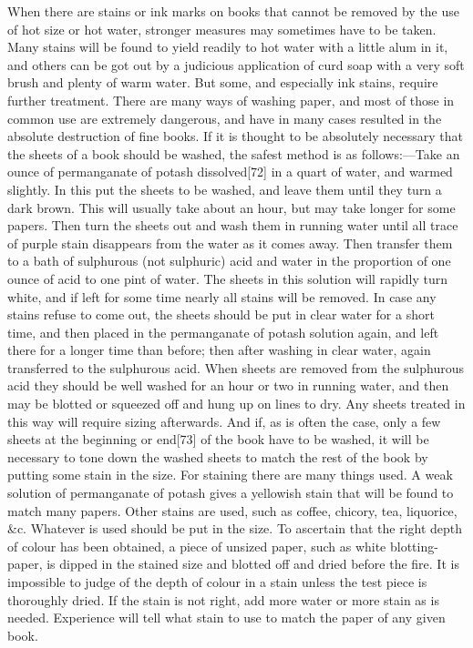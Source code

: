 \documentclass[
]{article}
\begin{document}
When there are stains or ink marks on books that cannot be removed by
the use of hot size or hot water, stronger measures may sometimes have
to be taken. Many stains will be found to yield readily to hot water
with a little alum in it, and others can be got out by a judicious
application of curd soap with a very soft brush and plenty of warm
water. But some, and especially ink stains, require further treatment.
There are many ways of washing paper, and most of those in common use
are extremely dangerous, and have in many cases resulted in the absolute
destruction of fine books. If it is thought to be absolutely necessary
that the sheets of a book should be washed, the safest method is as
follows:---Take an ounce of permanganate of potash
dissolved{\protect\hypertarget{Page_72}{}{{[}72{]}}} in a quart of
water, and warmed slightly. In this put the sheets to be washed, and
leave them until they turn a dark brown. This will usually take about an
hour, but may take longer for some papers. Then turn the sheets out and
wash them in running water until all trace of purple stain disappears
from the water as it comes away. Then transfer them to a bath of
sulphurous (not sulphuric) acid and water in the proportion of one ounce
of acid to one pint of water. The sheets in this solution will rapidly
turn white, and if left for some time nearly all stains will be removed.
In case any stains refuse to come out, the sheets should be put in clear
water for a short time, and then placed in the permanganate of potash
solution again, and left there for a longer time than before; then after
washing in clear water, again transferred to the sulphurous acid. When
sheets are removed from the sulphurous acid they should be well washed
for an hour or two in running water, and then may be blotted or squeezed
off and hung up on lines to dry. Any sheets treated in this way will
require sizing afterwards. And if, as is often the case, only a few
sheets at the beginning or
end{\protect\hypertarget{Page_73}{}{{[}73{]}}} of the book have to be
washed, it will be necessary to tone down the washed sheets to match the
rest of the book by putting some stain in the size. For staining there
are many things used. A weak solution of permanganate of potash gives a
yellowish stain that will be found to match many papers. Other stains
are used, such as coffee, chicory, tea, liquorice, \&c. Whatever is used
should be put in the size. To ascertain that the right depth of colour
has been obtained, a piece of unsized paper, such as white
blotting-paper, is dipped in the stained size and blotted off and dried
before the fire. It is impossible to judge of the depth of colour in a
stain unless the test piece is thoroughly dried. If the stain is not
right, add more water or more stain as is needed. Experience will tell
what stain to use to match the paper of any given book.
\end{document}
